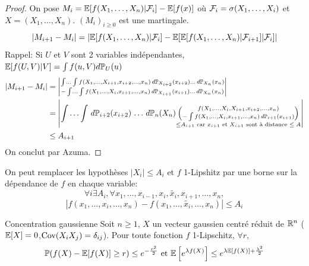 \documentclass[]{report}
\begin{document}
    \begin{proof}
        On pose $M_i=\mathbb{E}[f(X_1,\ldots,X_n)|\mathcal{F}_i]-\mathbb{E}[f(x)]$ où  $\mathcal{F}_i=\sigma (X_1,\ldots,X_i)$ et $X=(X_1,\ldots,X_n)$.
        $(M_i)_{i\ge 0}$ est une martingale.
        \[|M_{i+1}-M_i|=\left|\mathbb{E}[f(X_1,\ldots,X_n)|\mathcal{F}_i]-\mathbb{E}[\mathbb{E}[f(X_1,\ldots,X_n)|\mathcal{F}_{i+1}]|\mathcal{F}_i]\right|\]
        Rappel: Si $U$ et $V$ sont 2 variables indépendantes, $\mathbb{E}[f(U,V)|V]=\int f(u,V) d\mathbb{P}_U(u)$
        \begin{align*}
            |M_{i+1}-M_i|&=\left| \substack{\int \ldots \int f(X_1,\ldots,X_{i+1},x_{i+2},\ldots,x_n) \, d\mathbb{P}_{X_{i+2}}(x_{i+2})\ldots \, d\mathbb{P}_{X_n}(x_n)\\-\int \ldots \int f(X_1,\ldots,X_{i},x_{i+1},\ldots,x_n) \, d\mathbb{P}_{X_{i+1}}(x_{i+1})\ldots \, d\mathbb{P}_{X_n}(x_n)}\right|\\
            &=\left| \int\ldots  \int\,  d\mathbb{P}_{i+2}(x_{i+2})\, \ldots\, d\mathbb{P}_n(X_n) \underset{\le A_{i+1} \text{ car $x_{i+1}$ et $X_{i+1}$ sont à distance $\le A$}}{\left(\substack{f(X_1,\ldots,X_i,X_{i+1},x_{i+2},\ldots,x_n)\\-\int f(X_1,\ldots,X_i,x_{i+1},\ldots,x_n)\, d\mathbb{P}_{i+1}(x_{i+1})}\right)}\right|\\
            &\le A_{i+1}
        \end{align*}
        On conclut par Azuma.
    \end{proof}

    \begin{re}{}{}
        On peut remplacer les hypothèses $|X_i|\le A_i$ et $f$ 1-Lipshitz par une  borne sur la dépendance de $f$ en chaque variable:
        \[\forall i\exists A_i,\forall x_1,\ldots,x_{i-1},x_i,\tilde{x_i},x_{i+1},\ldots, x_{n},\]
        \[\left| f(x_1,\ldots,x_i,\ldots,x_n)-f(x_1,\ldots,\tilde{x_i},\ldots,x_n)\right|\le A_i\]
    \end{re}

    \begin{tm}{Concentration gaussienne}{}
        Soit $n\ge 1$, $X$ un vecteur gaussien centré réduit de $\mathbb{R}^n$ ($\mathbb{E}[X]=0$,$\text{Cov}(X_i X_j)=\delta_{ij}$). Pour toute fonction $f$ 1-Lipschitz, $\forall r,$
        \[\mathbb{P}(f(X)-\mathbb{E}[f(X)]\ge r)\le e^{-\frac{r^2}{2}}\text{ et }\mathbb{E}\left[e^{\lambda f(X)}\right]\le e^{\lambda \mathbb{E}[f(X)]+\frac{\lambda^2}{2}}\]
    \end{tm}
\end{document}
